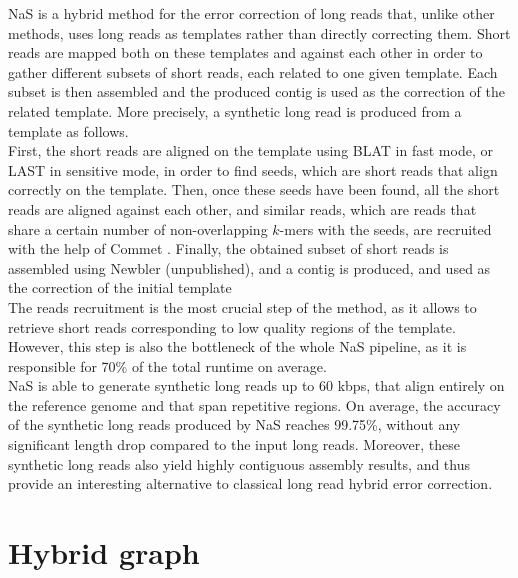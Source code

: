 \documentclass[long, final]{jobim2017}
\begin{document}
NaS is a hybrid method for the error correction of long reads that, unlike other methods, uses long reads as templates rather than directly correcting them. Short reads are mapped both on these templates and against each other in order to gather different subsets of short reads, each related to one given template. Each subset is then assembled and the produced contig is used as the correction of the related template. More precisely, a synthetic long read is produced from a template as follows. \\
\indent First, the short reads are aligned on the template using BLAT \cite{Kent2002} in fast mode, or LAST \cite{Kielbasa2011} in sensitive mode, in order to find seeds, which are short reads that align correctly on the template. Then, once these seeds have been found, all the short reads are aligned against each other, and similar reads, which are reads that share a certain number of non-overlapping $k$-mers with the seeds, are recruited with the help of Commet \cite{Maillet2014}. Finally, the obtained subset of short reads is assembled using Newbler (unpublished), and a contig is produced, and used as the correction of the initial template \\ 
\indent The reads recruitment is the most crucial step of the method, as it allows to retrieve short reads corresponding to low quality
regions of the template. However, this step is also the bottleneck of the whole NaS pipeline, as it is responsible for 70\% of the
total runtime on average. \\
\indent NaS is able to generate synthetic long reads up to 60 kbps, that align entirely on the reference genome and that span repetitive regions. On average, the accuracy of the synthetic long reads produced by NaS reaches 99.75\%, without any significant length drop compared to the input long reads. Moreover, these synthetic long reads also yield highly contiguous assembly results, and thus provide an interesting alternative to classical long read hybrid error correction.

\section{Hybrid graph}
\label{sec:HG}
\end{document}
